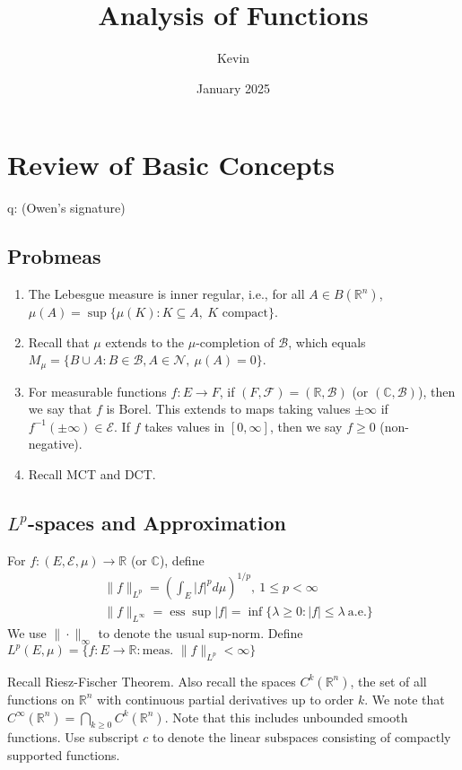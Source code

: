 \documentclass{article}
\title{Analysis of Functions}
\author{Kevin}
\date{January 2025}
\theoremstyle{definition}
\theoremstyle{remark}
\theoremstyle{plain}
\newcommand{\RR}{\mathbb{R}}
\newcommand{\CC}{\mathbb{C}}
\begin{document}
\maketitle
\section{Review of Basic Concepts}
q: (Owen's signature)\\
\subsection{Probmeas}
\begin{enumerate}
    \item The Lebesgue measure is inner regular, i.e., for all $A\in B(\RR^n)$, $\mu(A)=\sup\{\mu(K):K\subseteq A,\ K\text{ compact}\}$.
    \item Recall that $\mu$ extends to the $\mu$-completion of $\mathcal B$, which equals $M_\mu=\{B\cup A: B\in \mathcal B,A\in\mathcal N,\ \mu(A)=0\}$.
    \item For measurable functions $f:E\to F$, if $(F,\mathcal F)=(\RR,\mathcal B)$ (or $(\CC,\mathcal B)$), then we say that $f$ is Borel. This extends to maps taking values $\pm\infty$ if $f^{-1}({\pm\infty})\in\mathcal E$. If $f$ takes values in $[0,\infty]$, then we say $f\ge 0$ (non-negative).
    \item Recall MCT and DCT.
\end{enumerate}
\subsection{$L^p$-spaces and Approximation}
For $f:(E,\mathcal E,\mu)\to \RR$ (or $\CC$), define
\begin{align*}
    &\|f\|_{L^p}=\left(\int_E |f|^pd\mu\right)^{1/p},\ 1\le p<\infty\\
    &\|f\|_{L^\infty}=\operatorname{ess}\sup|f|=\inf\{\lambda\ge0:|f|\le \lambda\ \text{a.e.}\}
\end{align*}
We use $\|\cdot\|_\infty$ to denote the usual sup-norm. Define $L^p(E,\mu)=\{f:E\to\RR:\text{meas. }\|f\|_{L^p}<\infty\}$

Recall Riesz-Fischer Theorem. Also recall the spaces $C^k(\RR^n)$, the set of all functions on $\RR^n$ with continuous partial derivatives up to order $k$. We note that $C^\infty(\RR^n)=\bigcap_{k\ge 0}C^k(\RR^n)$. Note that this includes unbounded smooth functions. Use subscript $c$ to denote the linear subspaces consisting of compactly supported functions.
\end{document}
